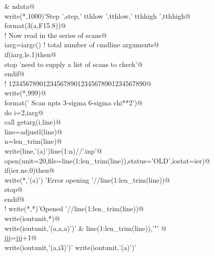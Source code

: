 \documentclass[10pt,a4paper,notitlepage]{article}
\begin{document}
\begin{flushleft}
\begin{list}{}{}
\mbox{}\verb@     & ndata@\\
\mbox{}\verb@      write(*,1000)'Step ',step,' tthlow ',tthlow,' tthhigh ',tthhigh@\\
\mbox{} format(3(a,F15.8))@\\
\mbox{}\verb@! Now read in the series of scans@\\
\mbox{}\verb@      iarg=iargc() ! total number of cmdline arguments@\\
\mbox{}\verb@      if(iarg.le.1)then@\\
\mbox{}\verb@       stop 'need to supply a list of scans to check'@\\
\mbox{}\verb@      endif@\\
\mbox{}\verb@!                    1234567890123456789012345678901234567890@\\
\mbox{}\verb@      write(*,999)@\\
\mbox{}  format('      Scan      npts   3-sigma  6-sigma     chi**2')@\\
\mbox{}\verb@      do i=2,iarg@\\
\mbox{}\verb@       call getarg(i,line)@\\
\mbox{}\verb@       line=adjustl(line)@\\
\mbox{}\verb@       n=len_trim(line)@\\
\mbox{}\verb@       write(line,'(a)')line(1:n)//'.inp'@\\
\mbox{}\verb@       open(unit=20,file=line(1:len_trim(line)),status='OLD',iostat=ier)@\\
\mbox{}\verb@       if(ier.ne.0)then@\\
\mbox{}\verb@        write(*,'(a)') 'Error opening '//line(1:len_trim(line))@\\
\mbox{}\verb@        stop@\\
\mbox{}\verb@       endif@\\
\mbox{}\verb@!       write(*,*)'Opened '//line(1:len_trim(line))@\\
\mbox{}\verb@       write(ioutunit,*)@\\
\mbox{}\verb@       write(ioutunit,'(a,a,a)')'% linelabel = "',                          &@\\
\mbox{}\verb@     &   line(1:len_trim(line)),'"'      @\\
\mbox{}\verb@       jjj=jjj+1@\\
\mbox{}\verb@       write(ioutunit,'(a,i3)')'% linecolor = ',jjj      @\\
\mbox{}\verb@       write(ioutunit,'(a)')'% linetype=1 markertype=0'@\\

\end{list}
\end{flushleft}
\end{document}
